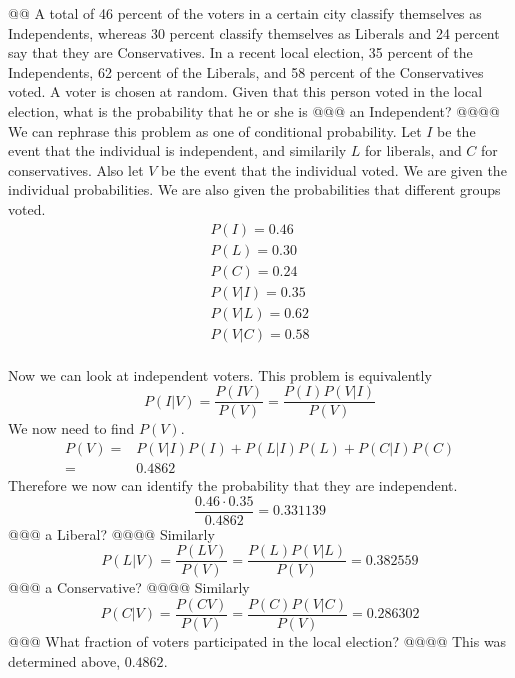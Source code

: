 \documentclass[10pt]{article}
\begin{document}
\begin{easylist}[enumerate]
    @@ A total of 46 percent of the voters in a certain city classify themselves as Independents, whereas 30 percent
    classify themselves as Liberals and 24 percent say that they are Conservatives. In a recent local election, 35
    percent of the Independents, 62 percent of the Liberals, and 58 percent of the Conservatives voted. A voter is
    chosen at random. Given that this person voted in the local election, what is the probability that he or she is
    @@@ an Independent?
    @@@@ We can rephrase this problem as one of conditional probability. Let $I$ be the event that the individual is
    independent, and similarily $L$ for liberals, and $C$ for conservatives. Also let $V$ be the event that the
    individual voted. We are given the individual probabilities. We are also given the probabilities that different
    groups voted.
        \[
            \begin{aligned}
                P(I) = 0.46\\
                P(L) = 0.30\\
                P(C) = 0.24\\
                P(V|I) = 0.35\\
                P(V|L) = 0.62\\
                P(V|C) = 0.58\\
            \end{aligned}
        \]

    Now we can look at independent voters. This problem is equivalently
        \[ P(I|V) = \frac{P(IV)}{P(V)} = \frac{P(I) P(V|I)}{P(V)} \]
    We now need to find $P(V)$.
        \[
            \begin{aligned}
                P(V) =& P(V|I)P(I) + P(L|I)P(L) + P(C|I)P(C)\\
                     =& 0.4862
            \end{aligned}
        \]
    Therefore we now can identify the probability that they are independent.
        \[ \frac{0.46 \cdot 0.35}{0.4862} = \boxed{0.331139} \]
    @@@ a Liberal?
    @@@@ Similarly
        \[ P(L|V) = \frac{P(LV)}{P(V)} = \frac{P(L) P(V|L)}{P(V)} = \boxed{0.382559} \]
    @@@ a Conservative?
    @@@@ Similarly
        \[ P(C|V) = \frac{P(CV)}{P(V)} = \frac{P(C) P(V|C)}{P(V)} = \boxed{0.286302} \]
    @@@ What fraction of voters participated in the local election?
    @@@@ This was determined above, $\boxed{0.4862}$.


\end{easylist}
\end{document}
